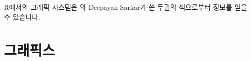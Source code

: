 %
%
%
%
%

R에서의 그래픽 시스템은 \citet{Murrell2005}와 Deepayan Sarkar가 쓴 두권의 책으로부터 정보를 얻을 수 있습니다.


\chapter{그래픽스}


